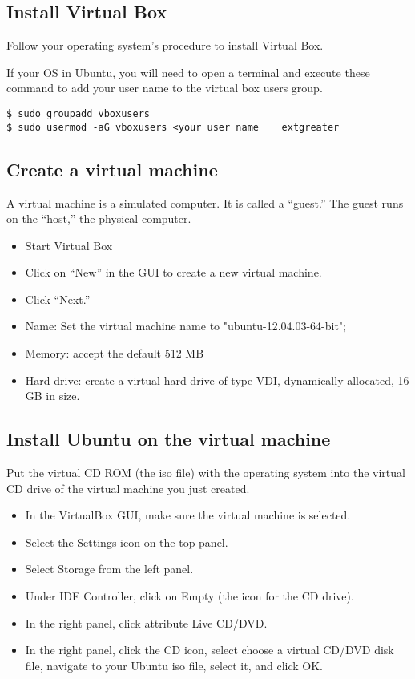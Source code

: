 \documentclass{article}
\begin{document}
\subsection{Install Virtual Box}

Follow your operating system's procedure to install Virtual Box.

If your OS in Ubuntu, you will need to open a terminal and execute these
command to add your user name to the virtual box users group.

\begin{verbatim}
$ sudo groupadd vboxusers
$ sudo usermod -aG vboxusers <your user name	extgreater
\end{verbatim}

\subsection{Create a virtual machine}

A virtual machine is a simulated computer. It is called a ``guest.'' The
guest runs on the ``host,'' the physical computer.

\begin{itemize}
  \item Start Virtual Box
  \item Click on ``New'' in the GUI to create a new virtual machine.
  \item Click ``Next.''
  \item Name: Set the virtual machine name to "ubuntu-12.04.03-64-bit"; 
  \item Memory: accept the default 512 MB
  \item Hard drive: create a virtual hard drive of type VDI, dynamically
    allocated, 16 GB in size.
\end{itemize}

\subsection{Install Ubuntu on the virtual machine}

Put the virtual CD ROM (the iso file) with the operating system into the virtual CD
drive of the virtual machine you just created.

\begin{itemize}
  \item In the VirtualBox GUI, make sure the virtual machine is
    selected.
  \item Select the Settings icon on the top panel.
  \item Select Storage from the left panel.
  \item Under IDE Controller, click on Empty (the icon for the CD
    drive).
  \item In the right panel, click attribute Live CD/DVD.
  \item In the right panel, click the CD icon, select choose a virtual
    CD/DVD disk file, navigate to your Ubuntu iso file, select it, and
    click OK.
\end{itemize}
\end{document}
